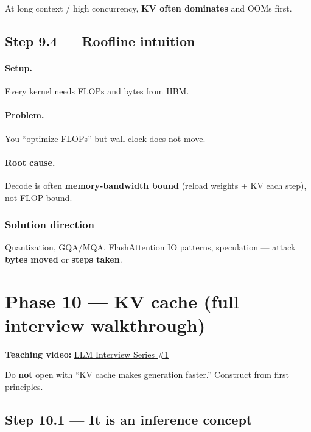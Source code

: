 \documentclass[11pt,a4paper]{article}
\begin{document}
At long context / high concurrency, \textbf{KV often dominates} and OOMs first.


\subsection{Step 9.4 --- Roofline intuition}


\paragraph{Setup.}

Every kernel needs FLOPs and bytes from HBM.


\paragraph{Problem.}

You ``optimize FLOPs'' but wall-clock does not move.


\paragraph{Root cause.}

Decode is often \textbf{memory-bandwidth bound} (reload weights + KV each step), not FLOP-bound.


\subsubsection{Solution direction}

Quantization, GQA/MQA, FlashAttention IO patterns, speculation --- attack \textbf{bytes moved} or \textbf{steps taken}.


\bigskip


\clearpage
\section{Phase 10 --- KV cache (full interview walkthrough)}


\textbf{Teaching video:} \href{https://www.youtube.com/watch?v=CxRGWfcGVbs}{LLM Interview Series \#1}


Do \textbf{not} open with ``KV cache makes generation faster.'' Construct from first principles.


\subsection{Step 10.1 --- It is an inference concept}
\end{document}
